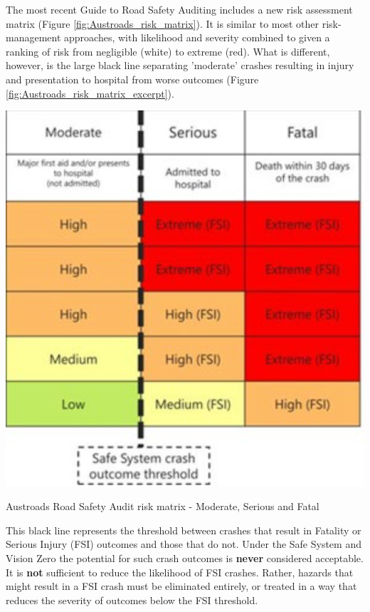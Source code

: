 \documentclass{tufte-handout}
\begin{document}
The most recent Guide to Road Safety Auditing\cite{Hillier:2022aa} includes a new risk assessment matrix (Figure \ref{fig:Austroads_risk_matrix}). It is similar to most other risk-management approaches, with likelihood and severity combined to given a ranking of risk from negligible (white) to extreme (red). What is different, however, is the large black line separating 'moderate' crashes resulting in injury and presentation to hospital from worse outcomes (Figure \ref{fig:Austroads_risk_matrix_excerpt}).  

\begin{marginfigure}
\includegraphics{Austroads_risk_matrix_excerpt}
\caption{Austroads Road Safety Audit risk matrix - Moderate, Serious and Fatal}
\label{fig:Austroads_risk_matrix_excerpt}
\end{marginfigure}

This black line represents the threshold between crashes that result in Fatality or Serious Injury (FSI) outcomes and those that do not. Under the Safe System and Vision Zero the potential for such crash outcomes is \textbf{never} considered acceptable.  It is \textbf{not} sufficient to reduce the likelihood of FSI crashes. Rather, hazards that might result in a FSI crash must be eliminated entirely, or treated in a way that reduces the severity of outcomes below the FSI threshold.   
\end{document}
